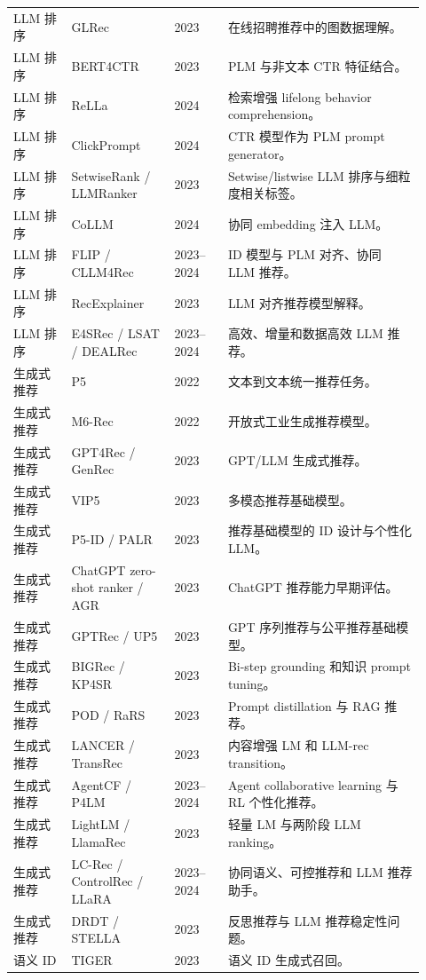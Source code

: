 \documentclass[UTF8,fontset=fandol,11pt]{ctexart}
\begin{document}
\begin{longtable}{@{}p{0.13\linewidth}p{0.23\linewidth}p{0.12\linewidth}p{0.44\linewidth}@{}}
LLM 排序 & GLRec & 2023 & 在线招聘推荐中的图数据理解。\\
LLM 排序 & BERT4CTR & 2023 & PLM 与非文本 CTR 特征结合。\\
LLM 排序 & ReLLa & 2024 & 检索增强 lifelong behavior comprehension。\\
LLM 排序 & ClickPrompt & 2024 & CTR 模型作为 PLM prompt generator。\\
LLM 排序 & SetwiseRank / LLMRanker & 2023 & Setwise/listwise LLM 排序与细粒度相关标签。\\
LLM 排序 & CoLLM & 2024 & 协同 embedding 注入 LLM。\\
LLM 排序 & FLIP / CLLM4Rec & 2023--2024 & ID 模型与 PLM 对齐、协同 LLM 推荐。\\
LLM 排序 & RecExplainer & 2023 & LLM 对齐推荐模型解释。\\
LLM 排序 & E4SRec / LSAT / DEALRec & 2023--2024 & 高效、增量和数据高效 LLM 推荐。\\
生成式推荐 & P5 & 2022 & 文本到文本统一推荐任务。\\
生成式推荐 & M6-Rec & 2022 & 开放式工业生成推荐模型。\\
生成式推荐 & GPT4Rec / GenRec & 2023 & GPT/LLM 生成式推荐。\\
生成式推荐 & VIP5 & 2023 & 多模态推荐基础模型。\\
生成式推荐 & P5-ID / PALR & 2023 & 推荐基础模型的 ID 设计与个性化 LLM。\\
生成式推荐 & ChatGPT zero-shot ranker / AGR & 2023 & ChatGPT 推荐能力早期评估。\\
生成式推荐 & GPTRec / UP5 & 2023 & GPT 序列推荐与公平推荐基础模型。\\
生成式推荐 & BIGRec / KP4SR & 2023 & Bi-step grounding 和知识 prompt tuning。\\
生成式推荐 & POD / RaRS & 2023 & Prompt distillation 与 RAG 推荐。\\
生成式推荐 & LANCER / TransRec & 2023 & 内容增强 LM 和 LLM-rec transition。\\
生成式推荐 & AgentCF / P4LM & 2023--2024 & Agent collaborative learning 与 RL 个性化推荐。\\
生成式推荐 & LightLM / LlamaRec & 2023 & 轻量 LM 与两阶段 LLM ranking。\\
生成式推荐 & LC-Rec / ControlRec / LLaRA & 2023--2024 & 协同语义、可控推荐和 LLM 推荐助手。\\
生成式推荐 & DRDT / STELLA & 2023 & 反思推荐与 LLM 推荐稳定性问题。\\
语义 ID & TIGER & 2023 & 语义 ID 生成式召回。\\

\end{longtable}
\end{document}
